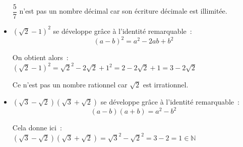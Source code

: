 \begin{corrige}
\begin{itemize}
          $ \dfrac{5}{7}$ n'est pas un nombre décimal car son écriture décimale est illimitée.
          \item %
          $\left(\sqrt{2}-1\right)^2$ se développe grâce à l'identité remarquable~:
          \[ (a-b)^2 = a^2-2ab+b^2 \]
          \par
          On obtient alors~:\\
          $\left(\sqrt{2}-1\right)^2= \sqrt{2}^2-2\sqrt{2}+1^2$\nosp$=2-2\sqrt{2}+1=3-2\sqrt{2}$
          \par
          Ce n'est pas un nombre rationnel car $\sqrt{2}$ est irrationnel.
          \item %
          $\left(\sqrt{3}-\sqrt{2}\right)\left(\sqrt{3}+\sqrt{2}\right)$ se développe grâce à l'identité remarquable~:
          \[ (a-b)(a+b) = a^2-b^2 \]
          \par
          Cela donne ici~:\\
          $\left(\sqrt{3}-\sqrt{2}\right)\left(\sqrt{3}+\sqrt{2}\right)= \sqrt{3}^2-\sqrt{2}^2$\nosp$=3-2=1 \in \mathbb{N}$
     \end{itemize}
\end{corrige}

